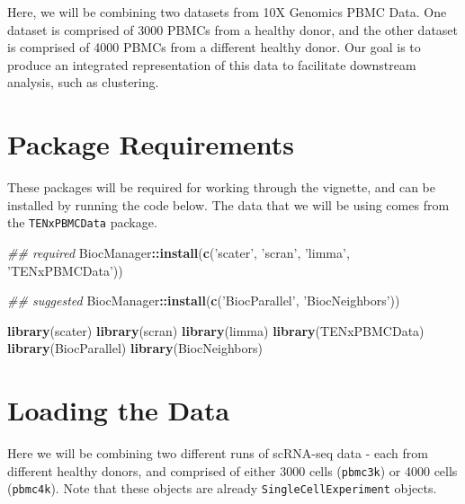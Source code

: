 \documentclass[]{book}
\newenvironment{Shaded}{\begin{snugshade}}{\end{snugshade}}
\newcommand{\CommentTok}[1]{\textcolor[rgb]{0.56,0.35,0.01}{\textit{#1}}}
\newcommand{\KeywordTok}[1]{\textcolor[rgb]{0.13,0.29,0.53}{\textbf{#1}}}
\newcommand{\NormalTok}[1]{#1}
\newcommand{\OperatorTok}[1]{\textcolor[rgb]{0.81,0.36,0.00}{\textbf{#1}}}
\newcommand{\StringTok}[1]{\textcolor[rgb]{0.31,0.60,0.02}{#1}}
\begin{document}
Here, we will be combining two datasets from 10X Genomics PBMC Data. One dataset is comprised of 3000 PBMCs from a healthy donor, and the other dataset is comprised of 4000 PBMCs from a different healthy donor. Our goal is to produce an integrated representation of this data to facilitate downstream analysis, such as clustering.

\hypertarget{package-requirements-1}{%
\section{Package Requirements}\label{package-requirements-1}}

These packages will be required for working through the vignette, and can be installed by running the code below. The data that we will be using comes from the \texttt{TENxPBMCData} package.

\begin{Shaded}
\begin{Highlighting}[]
\CommentTok{## required}
\NormalTok{BiocManager}\OperatorTok{::}\KeywordTok{install}\NormalTok{(}\KeywordTok{c}\NormalTok{(}\StringTok{'scater'}\NormalTok{, }\StringTok{'scran'}\NormalTok{, }\StringTok{'limma'}\NormalTok{, }\StringTok{'TENxPBMCData'}\NormalTok{))}

\CommentTok{## suggested}
\NormalTok{BiocManager}\OperatorTok{::}\KeywordTok{install}\NormalTok{(}\KeywordTok{c}\NormalTok{(}\StringTok{'BiocParallel'}\NormalTok{, }\StringTok{'BiocNeighbors'}\NormalTok{))}
\end{Highlighting}
\end{Shaded}

\begin{Shaded}
\begin{Highlighting}[]
\KeywordTok{library}\NormalTok{(scater)}
\KeywordTok{library}\NormalTok{(scran)}
\KeywordTok{library}\NormalTok{(limma)}
\KeywordTok{library}\NormalTok{(TENxPBMCData)}
\KeywordTok{library}\NormalTok{(BiocParallel)}
\KeywordTok{library}\NormalTok{(BiocNeighbors)}
\end{Highlighting}
\end{Shaded}

\hypertarget{loading-the-data-1}{%
\section{Loading the Data}\label{loading-the-data-1}}

Here we will be combining two different runs of scRNA-seq data - each from different healthy donors, and comprised of either 3000 cells (\texttt{pbmc3k}) or 4000 cells (\texttt{pbmc4k}). Note that these objects are already \texttt{SingleCellExperiment} objects.
\end{document}
